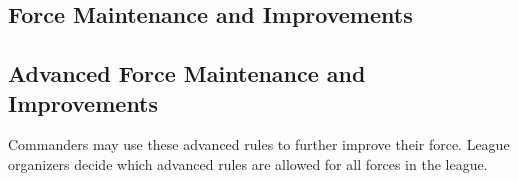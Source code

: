 

\subsection{Force Maintenance and Improvements}
\label{subsec:force_maintenance}



\newpage

\subsection{Advanced Force Maintenance and Improvements}

Commanders may use these advanced rules to further improve their force.
League organizers decide which advanced rules are allowed for all forces in the league.

